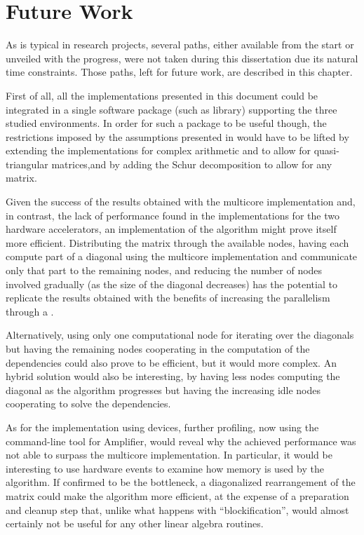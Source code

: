 \documentclass[../thesis]{subfiles}
\begin{document}
	\section{Future Work}
	\label{sec:conclusions:futurework}

	As is typical in research projects, several paths, either available from the start or unveiled with the progress, were not taken during this dissertation due its natural time constraints. Those paths, left for future work, are described in this chapter.

	First of all, all the implementations presented in this document could be integrated in a single software package (such as \blas library) supporting the three studied environments. In order for such a package to be useful though, the restrictions imposed by the assumptions presented in \label{sec:multicore:column} would have to be lifted by extending the implementations for complex arithmetic and to allow for quasi-triangular matrices,and by adding the Schur decomposition to allow for any matrix.

	Given the success of the results obtained with the multicore implementation and, in contrast, the lack of performance found in the implementations for the two hardware accelerators, an \mpi implementation of the algorithm might prove itself more efficient. Distributing the matrix through the available nodes, having each compute part of a diagonal using the multicore implementation and communicate only that part to the remaining nodes, and reducing the number of nodes involved gradually (as the size of the diagonal decreases) has the potential to replicate the results obtained with the benefits of increasing the parallelism through a \hetplat.

	Alternatively, using only one computational node for iterating over the diagonals but having the remaining nodes cooperating in the computation of the dependencies could also prove to be efficient, but it would more complex. An hybrid solution would also be interesting, by having less nodes computing the diagonal as the algorithm progresses but having the increasing idle nodes cooperating to solve the dependencies.

	As for the implementation using \intel\mic devices, further profiling, now using the command-line tool for \intel\vtune Amplifier, would reveal why the achieved performance was not able to surpass the multicore implementation. In particular, it would be interesting to use hardware events to examine how memory is used by the algorithm. If confirmed to be the bottleneck, a diagonalized rearrangement of the matrix could make the algorithm more efficient, at the expense of a preparation and cleanup step that, unlike what happens with ``blockification'', would almost certainly not be useful for any other linear algebra routines.
\end{document}
